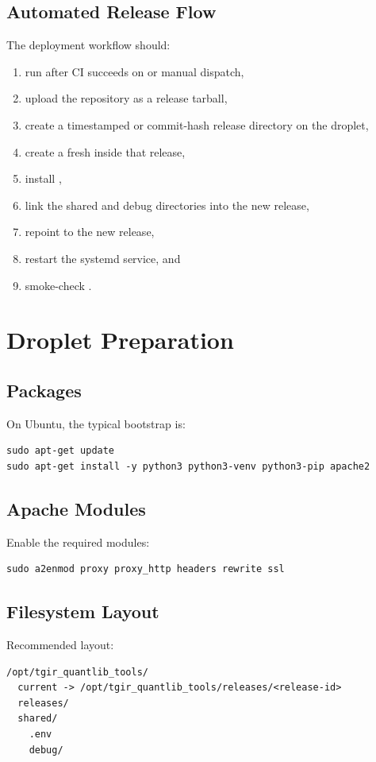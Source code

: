 \documentclass[conference]{IEEEtran}
\begin{document}
\subsection{Automated Release Flow}
The deployment workflow should:
\begin{enumerate}[leftmargin=1.5em]
    \item run after CI succeeds on  or manual dispatch,
    \item upload the repository as a release tarball,
    \item create a timestamped or commit-hash release directory on the droplet,
    \item create a fresh  inside that release,
    \item install ,
    \item link the shared  and debug directories into the new release,
    \item repoint  to the new release,
    \item restart the systemd service, and
    \item smoke-check .
\end{enumerate}

\section{Droplet Preparation}
\subsection{Packages}
On Ubuntu, the typical bootstrap is:
\begin{lstlisting}
sudo apt-get update
sudo apt-get install -y python3 python3-venv python3-pip apache2
\end{lstlisting}

\subsection{Apache Modules}
Enable the required modules:
\begin{lstlisting}
sudo a2enmod proxy proxy_http headers rewrite ssl
\end{lstlisting}

\subsection{Filesystem Layout}
Recommended layout:
\begin{lstlisting}
/opt/tgir_quantlib_tools/
  current -> /opt/tgir_quantlib_tools/releases/<release-id>
  releases/
  shared/
    .env
    debug/
\end{lstlisting}
\end{document}
